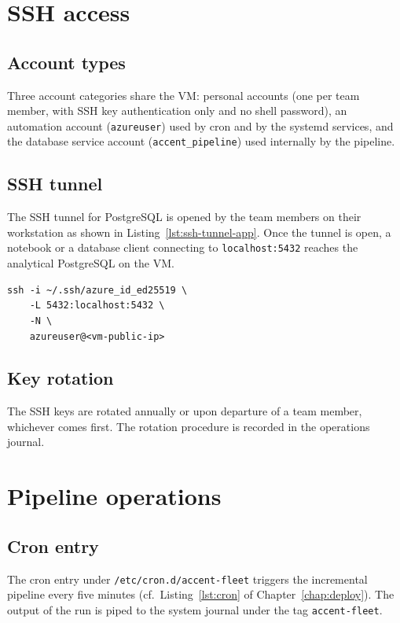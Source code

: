 \section{SSH access}

\subsection{Account types}
Three account categories share the VM: personal accounts (one per team member, with SSH key authentication only and no shell password), an automation account (\texttt{azureuser}) used by cron and by the systemd services, and the database service account (\texttt{accent\_pipeline}) used internally by the pipeline.

\subsection{SSH tunnel}
The SSH tunnel for PostgreSQL is opened by the team members on their workstation as shown in Listing~\ref{lst:ssh-tunnel-app}. Once the tunnel is open, a notebook or a database client connecting to \texttt{localhost:5432} reaches the analytical PostgreSQL on the VM.

\begin{lstlisting}[style=bash,caption={SSH tunnel for PostgreSQL access.},label={lst:ssh-tunnel-app}]
ssh -i ~/.ssh/azure_id_ed25519 \
    -L 5432:localhost:5432 \
    -N \
    azureuser@<vm-public-ip>
\end{lstlisting}

\subsection{Key rotation}
The SSH keys are rotated annually or upon departure of a team member, whichever comes first. The rotation procedure is recorded in the operations journal.

\section{Pipeline operations}

\subsection{Cron entry}
The cron entry under \texttt{/etc/cron.d/accent-fleet} triggers the incremental pipeline every five minutes (cf.\ Listing~\ref{lst:cron} of Chapter~\ref{chap:deploy}). The output of the run is piped to the system journal under the tag \texttt{accent-fleet}.

